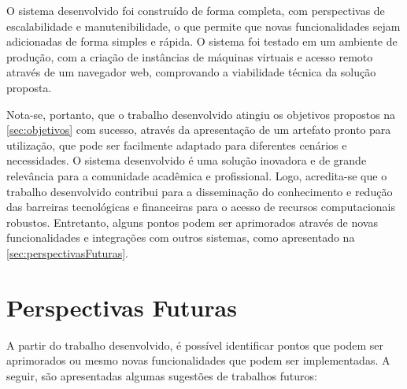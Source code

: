 O sistema desenvolvido foi construído de forma completa, com perspectivas de escalabilidade e manutenibilidade, o que permite que novas funcionalidades sejam adicionadas de forma simples e rápida. O sistema foi testado em um ambiente de produção, com a criação de instâncias de máquinas virtuais e acesso remoto através de um navegador web, comprovando a viabilidade técnica da solução proposta.

Nota-se, portanto, que o trabalho desenvolvido atingiu os objetivos propostos na \autoref{sec:objetivos} com sucesso, através da apresentação de um artefato pronto para utilização, que pode ser facilmente adaptado para diferentes cenários e necessidades. O sistema desenvolvido é uma solução inovadora e de grande relevância para a comunidade acadêmica e profissional. Logo, acredita-se que o trabalho desenvolvido contribui para a disseminação do conhecimento e redução das barreiras tecnológicas e financeiras para o acesso de recursos computacionais robustos. Entretanto, alguns pontos podem ser aprimorados através de novas funcionalidades e integrações com outros sistemas, como apresentado na \autoref{sec:perspectivasFuturas}.








\section{Perspectivas Futuras}
\label{sec:perspectivasFuturas}

A partir do trabalho desenvolvido, é possível identificar pontos que podem ser aprimorados ou mesmo novas funcionalidades que podem ser implementadas. A seguir, são apresentadas algumas sugestões de trabalhos futuros:

